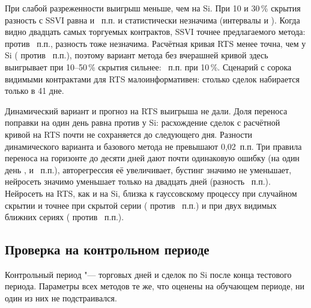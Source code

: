 \documentclass{article}
\begin{document}
При слабой разреженности выигрыш меньше, чем на Si. При 10 и 30\,\% скрытия разность с SSVI равна  и ~п.п. и статистически незначима (интервалы  и ). Когда видно двадцать самых торгуемых контрактов, SSVI точнее предлагаемого метода:  против ~п.п., разность тоже незначима. Расчётная кривая RTS менее точна, чем у Si ( против ~п.п.), поэтому вариант метода без вчерашней кривой здесь выигрывает при 10--50\,\% скрытия сильнее: ~п.п. при 10\,\%. Сценарий с сорока видимыми контрактами для RTS малоинформативен: столько сделок набирается только в 41 дне.

Динамический вариант и прогноз на RTS выигрыша не дали. Доля переноса поправки на один день равна  против  у Si: расхождение сделок с расчётной кривой на RTS почти не сохраняется до следующего дня. Разности динамического варианта и базового метода не превышают 0{,}02~п.п. Три правила переноса на горизонте до десяти дней дают почти одинаковую ошибку (на один день ,  и ~п.п.), авторегрессия её увеличивает, бустинг значимо не уменьшает, нейросеть значимо уменьшает только на двадцать дней (разность ~п.п.). Нейросеть на RTS, как и на Si, близка к гауссовскому процессу при случайном скрытии и точнее при скрытой серии ( против ~п.п.) и при двух видимых ближних сериях ( против ~п.п.).

\subsection{Проверка на контрольном периоде}\label{sec:holdout}

Контрольный период "---  торговых дней и  сделок по Si после конца тестового периода. Параметры всех методов те же, что оценены на обучающем периоде, ни один из них не подстраивался.
\end{document}
